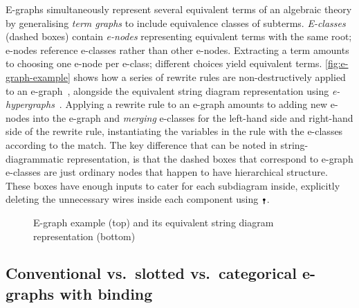E-graphs simultaneously represent several equivalent terms of an algebraic theory by generalising \emph{term graphs} to include equivalence classes of subterms.
\emph{E-classes} (dashed boxes) contain \emph{e-nodes} representing equivalent terms with the same root; e-nodes reference e-classes rather than other e-nodes.
Extracting a term amounts to choosing one e-node per e-class; different choices yield equivalent terms.
\autoref{fig:e-graph-example} shows how a series of rewrite rules are non-destructively applied to an e-graph~\cite{EggPaper}, alongside the equivalent string diagram representation using \emph{e-hypergraphs}~\cite{tiurin2025equivalencehypergraphsdporewriting}.
Applying a rewrite rule to an e-graph amounts to adding new e-nodes into the e-graph and \emph{merging} e-classes for the left-hand side and right-hand side of the rewrite rule, instantiating the variables in the rule with the e-classes according to the match.
The key difference that can be noted in string-diagrammatic representation, is that the dashed boxes that correspond to e-graph e-classes are just ordinary nodes that happen to have hierarchical structure.
These boxes have enough inputs to cater for each subdiagram inside, explicitly deleting the unnecessary wires inside each component using $\counit$.
\begin{figure}[t!]
	\begin{minipage}{0.18\textwidth}
		\centering
		\caption{String-dia\-gram\-matic representation of $\lambda f . f ((\lambda x . f x) 2)$.}
		\label{fig:de-brujin-string}
	\end{minipage}
	\hfill
	\begin{minipage}{0.8\textwidth}
		\begin{center}
		\end{center}
		\caption{E-graph example (top) and its equivalent string diagram representation (bottom)~\cite{tiurin2025equivalencehypergraphsdporewriting}}
		\label{fig:e-graph-example}
	\end{minipage}
\end{figure}

\subsection{Conventional vs.\ slotted vs.\ categorical e-graphs with binding}%
\label{sec:vs-e-graphs-with-binding}

